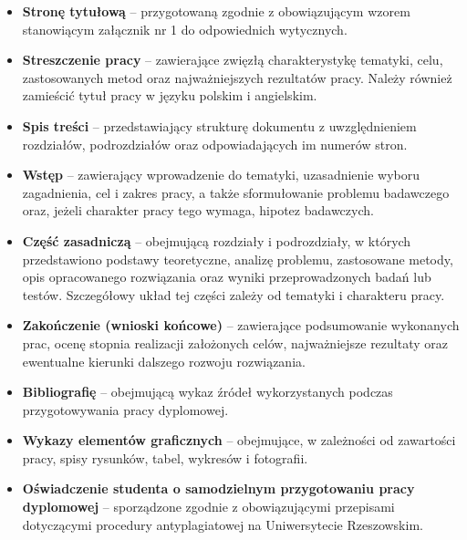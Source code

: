 \begin{itemize}

    \item \textbf{Stronę tytułową} -- przygotowaną zgodnie z obowiązującym wzorem stanowiącym załącznik nr 1 do odpowiednich wytycznych.

    \item \textbf{Streszczenie pracy} -- zawierające zwięzłą charakterystykę tematyki, celu, zastosowanych metod oraz najważniejszych rezultatów pracy. Należy również zamieścić tytuł pracy w języku polskim i angielskim.

    \item \textbf{Spis treści} -- przedstawiający strukturę dokumentu z uwzględnieniem rozdziałów, podrozdziałów oraz odpowiadających im numerów stron.

    \item \textbf{Wstęp} -- zawierający wprowadzenie do tematyki, uzasadnienie wyboru zagadnienia, cel i zakres pracy, a także sformułowanie problemu badawczego oraz, jeżeli charakter pracy tego wymaga, hipotez badawczych.

    \item \textbf{Część zasadniczą} --  obejmującą rozdziały i podrozdziały, w których przedstawiono podstawy teoretyczne, analizę problemu, zastosowane metody, opis opracowanego rozwiązania oraz wyniki przeprowadzonych badań lub testów. Szczegółowy układ tej części zależy od tematyki i charakteru pracy.

    \item \textbf{Zakończenie (wnioski końcowe)} -- zawierające podsumowanie wykonanych prac, ocenę stopnia realizacji założonych celów, najważniejsze rezultaty oraz ewentualne kierunki dalszego rozwoju rozwiązania.

    \item \textbf{Bibliografię} -- obejmującą wykaz źródeł wykorzystanych podczas przygotowywania pracy dyplomowej.

    \item \textbf{Wykazy elementów graficznych} -- obejmujące, w zależności od zawartości pracy, spisy rysunków, tabel, wykresów i fotografii.
    
    \item \textbf{Oświadczenie studenta o samodzielnym przygotowaniu pracy dyplomowej} -- sporządzone zgodnie z obowiązującymi przepisami dotyczącymi procedury antyplagiatowej na Uniwersytecie Rzeszowskim.

\end{itemize}

